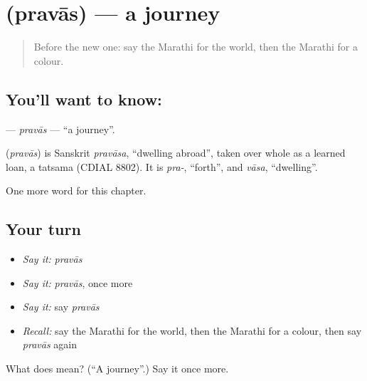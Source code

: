 \section[\texorpdfstring{\mr{प्रवास} (pravās)}{प्रवास (pravās)}]{ (pravās) — a journey}

\label{lesson:MR-C119-pravas}



\begin{quote}
Before the new one: say the Marathi for the world, then the Marathi for a colour.
\end{quote}

\subsection*{You'll want to know: }
\textbf{} — \emph{pravās} — \textquotedblleft{}a journey\textquotedblright{}.

\begin{cousinweb}
\textbf{} (\emph{pravās}) is Sanskrit \emph{pravāsa}, \textquotedblleft{}dwelling abroad\textquotedblright{}, taken over whole as a learned loan, a tatsama (CDIAL 8802). It is \emph{pra-}, \textquotedblleft{}forth\textquotedblright{}, and \emph{vāsa}, \textquotedblleft{}dwelling\textquotedblright{}.
\end{cousinweb}

\begin{grammarlens}[title={What you've built}]
One more word for this chapter.
\end{grammarlens}

\subsection*{Your turn}
\begin{itemize}
\raggedright
  \item \emph{Say it:} \emph{pravās}
  \item \emph{Say it:} \emph{pravās}, once more
  \item \emph{Say it:} say \emph{pravās}
  \item \emph{Recall:} say the Marathi for the world, then the Marathi for a colour, then say \emph{pravās} again
\end{itemize}

\begin{tcolorbox}[breakable,colback=teal!4,colframe=teal!35!black,title={Before you move on}]
What does  mean? (\textquotedblleft{}A journey\textquotedblright{}.) Say it once more.
\end{tcolorbox}
